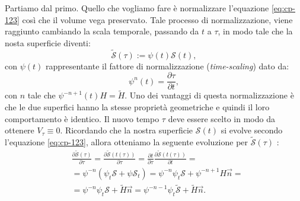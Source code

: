 Partiamo dal primo. Quello che vogliamo fare è normalizzare l'equazione \eqref{eq:cp-123} così che il volume vega preservato. Tale processo di normalizzazione, viene raggiunto cambiando la scala temporale, passando da $t$ a $\tau$, in modo tale che la nosta superficie diventi:
\[
\mathcal{\tilde{S}}(\tau):=\psi(t)\mathcal{S}(t),
\]
con $\psi(t)$ rappresentante il fattore di normalizzazione (\emph{time-scaling}) dato da:
\[
\psi^n(t) = \frac{\partial \tau}{\partial t},
\]
con $n$ tale che $\psi^{-n+1}(t)H=\tilde{H}$. Uno dei vantaggi di questa normalizzazione è che le due superfici hanno la stesse proprietà geometriche e quindi il loro comportamento è identico. Il nuovo tempo $\tau$ deve essere scelto in modo da ottenere $V_{\tau}\equiv 0$. Ricordando che la nostra superficie $\mathcal{S}(t)$ si evolve secondo l'equazione \eqref{eq:cp-123}, allora otteniamo la seguente evoluzione per $\mathcal{\tilde{S}}(\tau)$ : 
\[
\begin{aligned}
  &\frac{\partial\mathcal{\tilde{S}}(\tau)}{\partial\tau} =  \frac{\partial\mathcal{\tilde{S}}(t(\tau))}{\partial\tau} = \frac{\partial t}{\partial\tau}\frac{\partial\mathcal{\tilde{S}}(t(\tau))}{\partial t} =\\
  &=\psi^{-n}\left(\psi_t\mathcal{S}+\psi\mathcal{S}_t\right)=\psi^{-n}\psi_t\mathcal{S}+\psi^{-n+1}H\vec{n}=\\
  &=\psi^{-n}\psi_t\mathcal{S}+\tilde{H}\vec{n}=\psi^{-n-1}\psi_t\mathcal{\tilde{S}}+\tilde{H}\vec{n}.
\end{aligned}
\]

